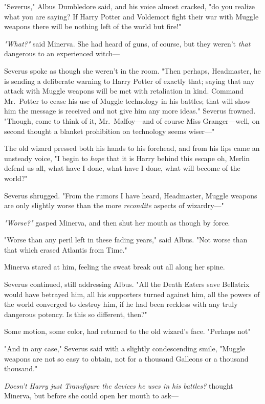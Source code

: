 "Severus," Albus Dumbledore said, and his voice almost cracked, "do you realize
what you are saying? If Harry Potter and Voldemort fight their war with Muggle
weapons there will be nothing left of the world but fire!"

\emph{"What?"} said Minerva. She had heard of guns, of course, but they weren't
\emph{that} dangerous to an experienced witch\mbox{---}

Severus spoke as though she weren't in the room. "Then perhaps, Headmaster, he
is sending a deliberate warning to Harry Potter of exactly that; saying that
any attack with Muggle weapons will be met with retaliation in kind. Command
Mr.~Potter to cease his use of Muggle technology in his battles; that will show
him the message is received{\el} and not give him any more ideas." Severus
frowned. "Though, come to think of it, Mr.~Malfoy---and of course Miss
Granger---well, on second thought a blanket prohibition on technology seems
wiser\mbox{---}"

The old wizard pressed both his hands to his forehead, and from his lips came
an unsteady voice, "I begin to \emph{hope} that it is Harry behind this
escape{\el} oh, Merlin defend us all, what have I done, what have I done,
what will become of the world?"

Severus shrugged. "From the rumors I have heard, Headmaster, Muggle weapons are
only slightly worse than the more{\el} \emph{recondite} aspects of
wizardry\mbox{---}"

\emph{"Worse?"} gasped Minerva, and then shut her mouth as though by force.

"Worse than any peril left in these fading years," said Albus. "Not worse than
that which erased Atlantis from Time."

Minerva stared at him, feeling the sweat break out all along her spine.

Severus continued, still addressing Albus. "All the Death Eaters save Bellatrix
would have betrayed him, all his supporters turned against him, all the powers
of the world converged to destroy him, if he had been reckless with any truly
dangerous potency. Is this so different, then?"

Some motion, some color, had returned to the old wizard's face. "Perhaps
not{\el}"

"And in any case," Severus said with a slightly condescending smile, "Muggle
weapons are not so easy to obtain, not for a thousand Galleons or a thousand
thousand."

\emph{Doesn't Harry just Transfigure the devices he uses in his battles?}
thought Minerva, but before she could open her mouth to ask\mbox{---}

